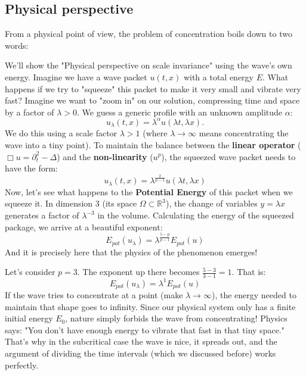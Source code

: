 \documentclass[11pt,letterpaper]{amsart}
\begin{document}
\subsection{Physical perspective}

From a physical point of view, the problem of concentration boils down to two words:

We'll show the "Physical perspective on scale invariance" using the wave's own energy. Imagine we have a wave packet $u(t,x)$ with a total energy $E$. What happens if we try to "squeeze" this packet to make it very small and vibrate very fast? Imagine we want to "zoom in" on our solution, compressing time and space by a factor of $\lambda > 0$. We guess a generic profile with an unknown amplitude $\alpha$:$$u_\lambda(t,x) = \lambda^\alpha u(\lambda t, \lambda x).$$ We do this using a scale factor $\lambda > 1$ (where $\lambda \to \infty$ means concentrating the wave into a tiny point). To maintain the balance between the {\bf linear operator} ($\Box u=\partial_t^2 - \Delta $) and the {\bf non-linearity} ($u^p$), the squeezed wave packet needs to have the form:
$$u_\lambda(t,x) = \lambda^{\frac{2}{p-1}} u(\lambda t, \lambda x)$$
Now, let's see what happens to the {\bf Potential Energy} of this packet when we squeeze it. In dimension 3 (its space $\Omega \subset \mathbb{R}^3$), the change of variables $y = \lambda x$ generates a factor of $\lambda^{-3}$ in the volume. Calculating the energy of the squeezed package, we arrive at a beautiful exponent:
$$E_{pot}(u_\lambda) = \lambda^{\frac{5-p}{p-1}} E_{pot}(u)$$
And it is precisely here that the physics of the phenomenon emerges!


Let's consider $p = 3$. The exponent up there becomes $\frac{5-3}{3-1} = 1$. That is:
$$E_{pot}(u_\lambda) = \lambda^1 E_{pot}(u)$$
If the wave tries to concentrate at a point (make $\lambda \to \infty$), the energy needed to maintain that shape goes to infinity. Since our physical system only has a finite initial energy $E_0$, nature simply forbids the wave from concentrating!
Physics says: "You don't have enough energy to vibrate that fast in that tiny space." That's why in the subcritical case the wave is nice, it spreads out, and the argument of dividing the time intervals (which we discussed before) works perfectly.

\end{document}
